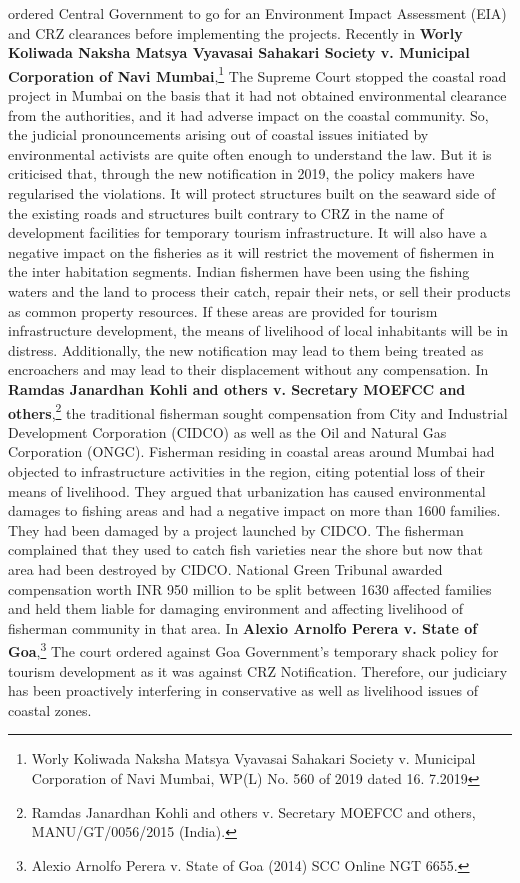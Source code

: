 \begin{multicols}{2}
ordered Central Government to go for an Environment Impact Assessment (EIA) and CRZ
clearances before implementing the projects. Recently in \textbf{Worly Koliwada Naksha Matsya
Vyavasai Sahakari Society v. Municipal Corporation of Navi Mumbai},\footnote{Worly Koliwada Naksha Matsya Vyavasai Sahakari Society v. Municipal Corporation of Navi Mumbai,
WP(L) No. 560 of 2019 dated 16. 7.2019} The Supreme
Court stopped the coastal road project in Mumbai on the basis that it had not obtained
environmental clearance from the authorities, and it had adverse impact on the coastal
community. So, the judicial pronouncements arising out of coastal issues initiated by
environmental activists are quite often enough to understand the law. But it is criticised that,
through the new notification in 2019, the policy makers have regularised the violations. It
will protect structures built on the seaward side of the existing roads and structures built
contrary to CRZ in the name of development facilities for temporary tourism infrastructure. It
will also have a negative impact on the fisheries as it will restrict the movement of fishermen
in the inter habitation segments. Indian fishermen have been using the fishing waters and the
land to process their catch, repair their nets, or sell their products as common property
resources. If these areas are provided for tourism infrastructure development, the means of
livelihood of local inhabitants will be in distress. Additionally, the new notification may lead
to them being treated as encroachers and may lead to their displacement without any compensation. In \textbf{Ramdas Janardhan Kohli and others v. Secretary MOEFCC and
others},\footnote{Ramdas Janardhan Kohli and others v. Secretary MOEFCC and others, MANU/GT/0056/2015 (India).} the traditional fisherman sought compensation from City and Industrial
Development Corporation (CIDCO) as well as the Oil and Natural Gas Corporation (ONGC).
Fisherman residing in coastal areas around Mumbai had objected to infrastructure activities in
the region, citing potential loss of their means of livelihood. They argued that urbanization
has caused environmental damages to fishing areas and had a negative impact on more than
1600 families. They had been damaged by a project launched by CIDCO. The fisherman
complained that they used to catch fish varieties near the shore but now that area had been
destroyed by CIDCO. National Green Tribunal awarded compensation worth INR 950
million to be split between 1630 affected families and held them liable for damaging
environment and affecting livelihood of fisherman community in that area. In \textbf{Alexio Arnolfo
Perera v. State of Goa},\footnote{Alexio Arnolfo Perera v. State of Goa (2014) SCC Online NGT 6655.} The court ordered against Goa Government’s temporary shack
policy for tourism development as it was against CRZ Notification. Therefore, our judiciary
has been proactively interfering in conservative as well as livelihood issues of coastal zones.


\end{multicols}
